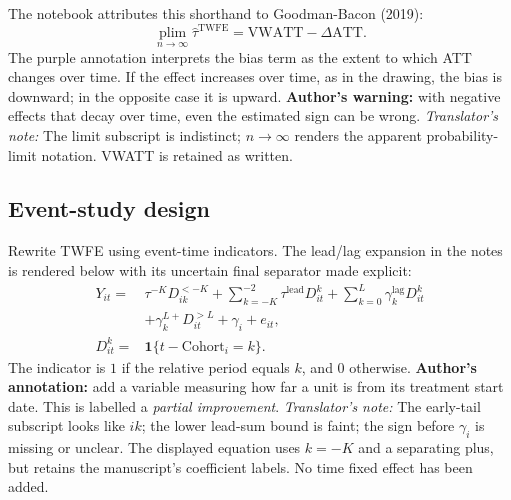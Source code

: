 The notebook attributes this shorthand to Goodman-Bacon (2019):
\[
\operatorname*{plim}_{n\to\infty}\widehat\tau^{\mathrm{TWFE}}
 =\mathrm{VWATT}-\Delta\mathrm{ATT}.
\]
The purple annotation interprets the bias term as the extent to which ATT changes over time. If the effect increases over time, as in the drawing, the bias is downward; in the opposite case it is upward. \textbf{Author's warning:} with negative effects that decay over time, even the estimated sign can be wrong.
\textit{Translator's note:} The limit subscript is indistinct; \(n\to\infty\) renders the apparent probability-limit notation. VWATT is retained as written.

\subsection{Event-study design}
Rewrite TWFE using event-time indicators. The lead/lag expansion in the notes is rendered below with its uncertain final separator made explicit:
\begin{align*}
Y_{it}={}&\tau^{-K}D_{ik}^{<-K}
 +\sum_{k=-K}^{-2}\tau^{\mathrm{lead}}D_{it}^{k}
 +\sum_{k=0}^{L}\gamma_k^{\mathrm{lag}}D_{it}^{k}\\
 &+\gamma_k^{L+}D_{it}^{>L}+\gamma_i+e_{it},\\
D_{it}^{k}={}&\mathbf1\{t-\mathrm{Cohort}_i=k\}.
\end{align*}
The indicator is \(1\) if the relative period equals \(k\), and \(0\) otherwise. \textbf{Author's annotation:} add a variable measuring how far a unit is from its treatment start date. This is labelled a \emph{partial improvement}.
\textit{Translator's note:} The early-tail subscript looks like \(ik\); the lower lead-sum bound is faint; the sign before \(\gamma_i\) is missing or unclear. The displayed equation uses \(k=-K\) and a separating plus, but retains the manuscript's coefficient labels. No time fixed effect has been added.

